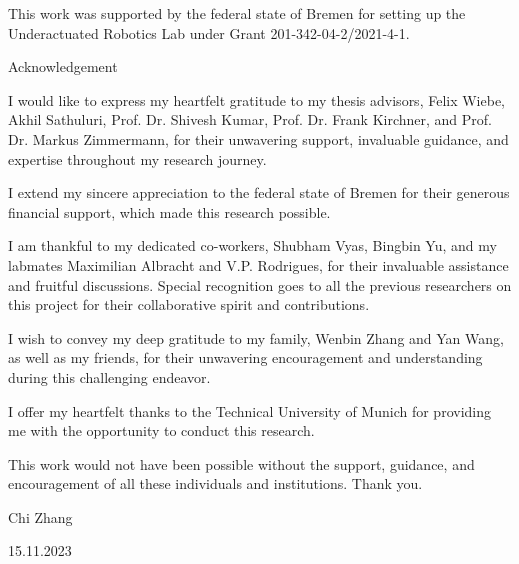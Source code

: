 This work was supported by the federal state of Bremen for setting up the Underactuated Robotics Lab under Grant 201-342-04-2/2021-4-1.

\newpage

\fontsize{18pt}{20pt}\selectfont

\vspace{25.3mm}
Acknowledgement

\normalsize\selectfont
\vspace{13.2mm}
I would like to express my heartfelt gratitude to my thesis advisors, Felix Wiebe, Akhil Sathuluri, Prof. Dr. Shivesh Kumar, Prof. Dr. Frank Kirchner, and Prof. Dr. Markus Zimmermann, for their unwavering support, invaluable guidance, and expertise throughout my research journey.

I extend my sincere appreciation to the federal state of Bremen for their generous financial support, which made this research possible. 

I am thankful to my dedicated co-workers, Shubham Vyas, Bingbin Yu, and my labmates Maximilian Albracht and V.P. Rodrigues, for their invaluable assistance and fruitful discussions. Special recognition goes to all the previous researchers on this project for their collaborative spirit and contributions.

I wish to convey my deep gratitude to my family, Wenbin Zhang and Yan Wang, as well as my friends, for their unwavering encouragement and understanding during this challenging endeavor.

I offer my heartfelt thanks to the Technical University of Munich for providing me with the opportunity to conduct this research.

This work would not have been possible without the support, guidance, and encouragement of all these individuals and institutions. Thank you.

Chi Zhang

15.11.2023

